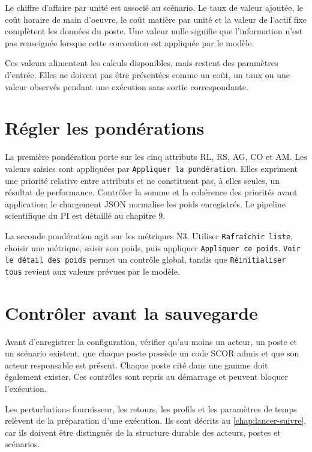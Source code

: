Le chiffre d'affaire par unité est associé au scénario. Le taux de valeur ajoutée, le coût horaire de main d'oeuvre, le coût matière par unité et la valeur de l'actif fixe complètent les données du poste. Une valeur nulle signifie que l'information n'est pas renseignée lorsque cette convention est appliquée par le modèle.

Ces valeurs alimentent les calculs disponibles, mais restent des paramètres d'entrée. Elles ne doivent pas être présentées comme un coût, un taux ou une valeur observés pendant une exécution sans sortie correspondante.

\section{Régler les pondérations}

La première pondération porte sur les cinq attributs RL, RS, AG, CO et AM. Les valeurs saisies sont appliquées par \texttt{Appliquer la pondération}. Elles expriment une priorité relative entre attributs et ne constituent pas, à elles seules, un résultat de performance. Contrôler la somme et la cohérence des priorités avant application; le chargement JSON normalise les poids enregistrés. Le pipeline scientifique du PI est détaillé au chapitre 9.


La seconde pondération agit sur les métriques N3. Utiliser \texttt{Rafraîchir liste}, choisir une métrique, saisir son poids, puis appliquer \texttt{Appliquer ce poids}. \texttt{Voir le détail des poids} permet un contrôle global, tandis que \texttt{Réinitialiser tous} revient aux valeurs prévues par le modèle.



\section{Contrôler avant la sauvegarde}

Avant d'enregistrer la configuration, vérifier qu'au moins un acteur, un poste et un scénario existent, que chaque poste possède un code SCOR admis et que son acteur responsable est présent. Chaque poste cité dans une gamme doit également exister. Ces contrôles sont repris au démarrage et peuvent bloquer l'exécution.

Les perturbations fournisseur, les retours, les profils et les paramètres de temps relèvent de la préparation d'une exécution. Ils sont décrits au \cref{chap:lancer-suivre}, car ils doivent être distingués de la structure durable des acteurs, postes et scénarios.
